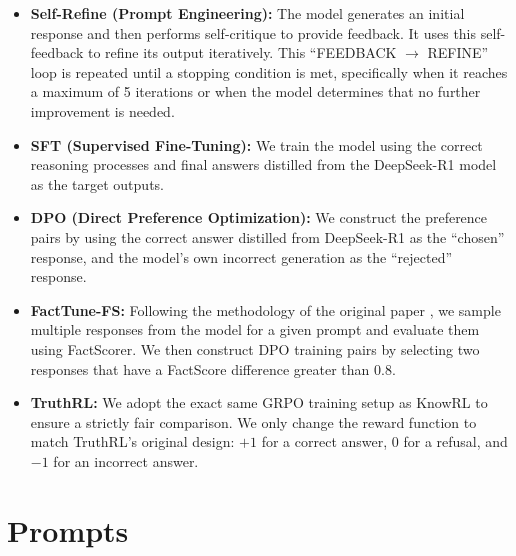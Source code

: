 \begin{itemize}
    \item \textbf{Self-Refine (Prompt Engineering):} The model generates an initial response and then performs self-critique to provide feedback.
    It uses this self-feedback to refine its output iteratively.
    This ``FEEDBACK $\rightarrow$ REFINE'' loop is repeated until a stopping condition is met, specifically when it reaches a maximum of 5 iterations or when the model determines that no further improvement is needed.
    
    \item \textbf{SFT (Supervised Fine-Tuning):} We train the model using the correct reasoning processes and final answers distilled from the DeepSeek-R1 model as the target outputs.
    
    \item \textbf{DPO (Direct Preference Optimization):} We construct the preference pairs by using the correct answer distilled from DeepSeek-R1 as the ``chosen'' response, and the model's own incorrect generation as the ``rejected'' response.
    
    \item \textbf{FactTune-FS:} Following the methodology of the original paper \cite{REPLACE_WITH_FACTTUNE_CITATION}, we sample multiple responses from the model for a given prompt and evaluate them using FactScorer.
    We then construct DPO training pairs by selecting two responses that have a FactScore difference greater than 0.8.
    
    \item \textbf{TruthRL:} We adopt the exact same GRPO training setup as KnowRL to ensure a strictly fair comparison.
    We only change the reward function to match TruthRL's original design: $+1$ for a correct answer, $0$ for a refusal, and $-1$ for an incorrect answer.
\end{itemize}














\section{Prompts}

\label{appendix:4o-prompt}



